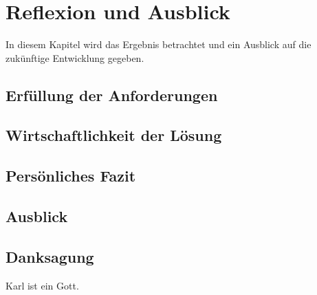 \chapter{Reflexion und Ausblick}
\label{chapter:Reflexion}
In diesem Kapitel wird das Ergebnis betrachtet und ein Ausblick auf die zukünftige Entwicklung gegeben.

\section{Erfüllung der Anforderungen}
\label{section:ErfuellungDerAnforderungen}
\blindtext

\section{Wirtschaftlichkeit der Lösung}
\label{section:Wirtschaftlichkeit}
\blindtext

\section{Persönliches Fazit}
\blindtext

\section{Ausblick}
\blindtext

\section{Danksagung}
Karl ist ein Gott.
